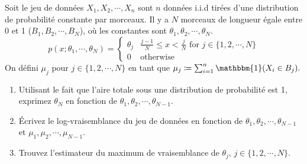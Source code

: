 \documentclass[11pt,french,english]{article}
\begin{document}
\begin{enumerate}
{Soit le jeu de données $X_1, X_2, \cdots, X_n$ sont $n$ données i.i.d tirées d'une distribution de probabilité constante par morceaux. Il y a $N$ morceaux de longueur égale entre 0 et 1 ($B_1, B_2, \cdots, B_N$), où les constantes sont $\theta_1, \theta_2, \cdots, \theta_N$.}
$$
p(x;\theta_1, \cdots, \theta_N) = 
\begin{cases} 
\theta_j 	&\frac{j-1}{N} \leq x  < \frac{j}{N} \mbox{ for } j \in \{1, 2, \cdots, N\}\\
0 		&\mbox{otherwise} 
\end{cases}
$$
{On défini $\mu_j$ pour $j \in \{1, 2, \cdots, N\}$ en tant que $\mu_j \coloneqq  \sum_{i=1}^n \mathbbm{1}(X_i \in B_j).$}

\begin{enumerate}
\item {}
{Utilisant le fait que l'aire totale sous une distribution de probabilité est 1, exprimez $\theta_N$ en fonction de $\theta_1, \theta_2, \cdots,  \theta_{N-1}$.}
\item {}
{Écrivez le log-vraisemblance du jeu de données en fonction de $\theta_1, \theta_2, \cdots,  \theta_{N-1}$ et $\mu_1, \mu_2, \cdots,  \mu_{N-1}$.}
\item {}
{Trouvez l'estimateur du maximum de vraisemblance de $\theta_j$, $j \in \{1, 2, \cdots, N\}.$}
\end{enumerate}


\end{enumerate}
\end{document}
